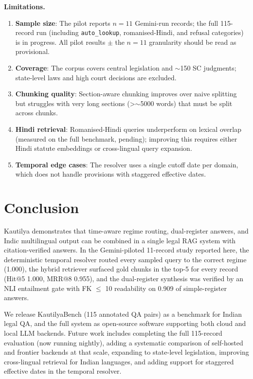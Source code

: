 \documentclass[conference]{IEEEtran}
\begin{document}
\textbf{Limitations.}
\begin{enumerate}
    \item \textbf{Sample size}: The pilot reports $n=11$ Gemini-run records; the full 115-record run (including \texttt{auto\_lookup}, romanised-Hindi, and refusal categories) is in progress. All pilot results $\pm$ the $n=11$ granularity should be read as provisional.
    \item \textbf{Coverage}: The corpus covers central legislation and $\sim$150 SC judgments; state-level laws and high court decisions are excluded.
    \item \textbf{Chunking quality}: Section-aware chunking improves over naive splitting but struggles with very long sections (>$\sim$5000 words) that must be split across chunks.
    \item \textbf{Hindi retrieval}: Romanised-Hindi queries underperform on lexical overlap (measured on the full benchmark, pending); improving this requires either Hindi statute embeddings or cross-lingual query expansion.
    \item \textbf{Temporal edge cases}: The resolver uses a single cutoff date per domain, which does not handle provisions with staggered effective dates.
\end{enumerate}

\section{Conclusion}
\label{sec:conclusion}

Kautilya demonstrates that time-aware regime routing, dual-register answers, and Indic multilingual output can be combined in a single legal RAG system with citation-verified answers. In the Gemini-piloted 11-record study reported here, the deterministic temporal resolver routed every sampled query to the correct regime (1.000), the hybrid retriever surfaced gold chunks in the top-5 for every record (Hit@5 1.000, MRR@8 0.955), and the dual-register synthesis was verified by an NLI entailment gate with FK $\leq$ 10 readability on 0.909 of simple-register answers.

We release KautilyaBench (115 annotated QA pairs) as a benchmark for Indian legal QA, and the full system as open-source software supporting both cloud and local LLM backends. Future work includes completing the full 115-record evaluation (now running nightly), adding a systematic comparison of self-hosted and frontier backends at that scale, expanding to state-level legislation, improving cross-lingual retrieval for Indian languages, and adding support for staggered effective dates in the temporal resolver.
\end{document}
